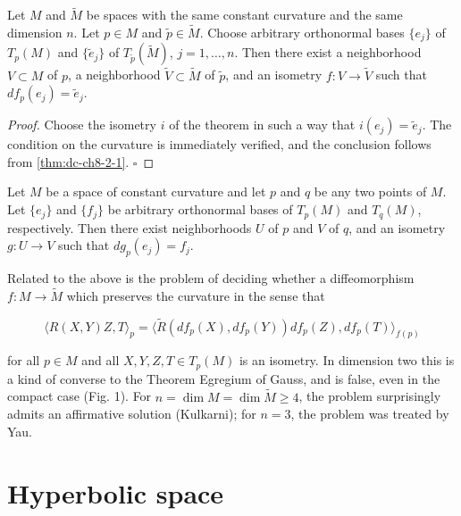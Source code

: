 \begin{corollary}[Corollary 2.2]
  \label{cor:dc-ch8-2-2}
  Let $M$ and $\tilde{M}$ be spaces with the same constant curvature and the same
  dimension $n$. Let $p\in M$ and $\tilde{p}\in\tilde{M}$. Choose arbitrary
  orthonormal bases $\{e_j\}$ of $T_p(M)$ and $\{\tilde{e}_j\}$ of $T_{\tilde{p}}(\tilde{M})$,
  $j=1,\dots,n$. Then there exist a neighborhood $V\subset M$ of $p$, a neighborhood
  $\tilde{V}\subset\tilde{M}$ of $\tilde{p}$, and an isometry $f:V\to\tilde{V}$ such
  that $df_p(e_j)=\tilde{e}_j$.
\end{corollary}
\begin{proof}
  Choose the isometry $i$ of the theorem in such a way that
  $i(e_j)=\tilde{e}_j$. The condition on the curvature is immediately verified, and
  the conclusion follows from \cref{thm:dc-ch8-2-1}. $\square$
\end{proof}

\begin{corollary}[Corollary 2.3]
  \label{cor:dc-ch8-2-3}
  Let $M$ be a space of constant curvature and let $p$ and $q$ be any two points of
  $M$. Let $\{e_j\}$ and $\{f_j\}$ be arbitrary orthonormal bases of $T_p(M)$ and
  $T_q(M)$, respectively. Then there exist neighborhoods $U$ of $p$ and $V$ of $q$,
  and an isometry $g:U\to V$ such that $dg_p(e_j)=f_j$.
  
  Related to the above is the problem of deciding whether a diffeomorphism
  $f:M\to\tilde{M}$ which preserves the curvature in the sense that
  
  $$
  \langle R(X,Y)Z,T\rangle_p=\big\langle\tilde{R}(df_p(X),df_p(Y))df_p(Z),df_p(T)\big\rangle_{f(p)}
  $$
  
  for all $p\in M$ and all $X,Y,Z,T\in T_p(M)$ is an isometry. In dimension two this
  is a kind of converse to the Theorem Egregium of Gauss, and is false, even in the
  compact case (Fig. 1). For $n=\dim M=\dim\tilde{M}\geq 4$, the problem
  surprisingly admits an affirmative solution (Kulkarni); for $n=3$, the problem was
  treated by Yau.
\end{corollary}

\section{Hyperbolic space}


